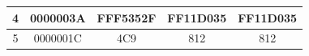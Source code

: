 \begin{table}[ht]
{\begin{tabular}{|c|c|cc|c|}
            4                                                                     & 0000003A               & \multicolumn{1}{c|}{FFF5352F}                                                        & FF11D035                                                           & FF11D035                                                                                                     \\ \hline
            5                                                                     & 0000001C               & \multicolumn{1}{c|}{4C9}                                                             & 812                                                                & 812                                                                                                          \\ \hline
        \end{tabular}%
    }
\end{table}